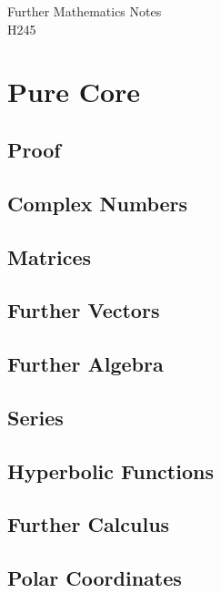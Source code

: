 \documentclass[a4paper]{report}
\begin{document}
\begin{titlepage}
	\raggedleft
	\vspace*{2cm}
	\Huge{Further Mathematics Notes}\\
	\vspace{0.5cm}
	\large{H245}
\end{titlepage}

\tableofcontents

\part{Pure Core}

\chapter{Proof}

\chapter{Complex Numbers}

\chapter{Matrices}

\chapter{Further Vectors}

\chapter{Further Algebra}

\chapter{Series}

\chapter{Hyperbolic Functions}

\chapter{Further Calculus}

\chapter{Polar Coordinates}
\end{document}
